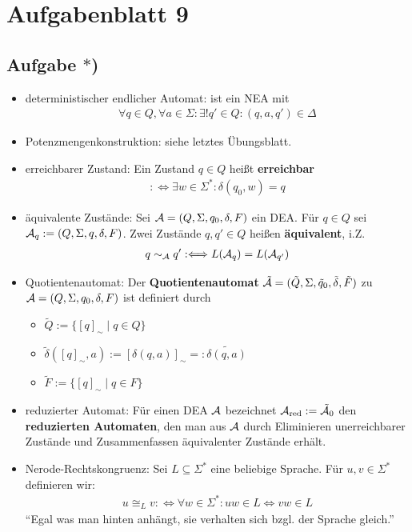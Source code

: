 \section{Aufgabenblatt 9}
\subsection*{Aufgabe $\ast$)}
\begin{itemize}
	\item deterministischer endlicher Automat: ist ein NEA mit
	\begin{align*}
		\forall q\in Q,\forall a\in\Sigma:\exists! q'\in Q:(q,a,q')\in\Delta
	\end{align*}
	\item Potenzmengenkonstruktion: siehe letztes Übungsblatt.
	\item erreichbarer Zustand: Ein Zustand $q\in Q$ heißt \textbf{erreichbar}
	\begin{align*}
		:\Longleftrightarrow\exists w\in\Sigma^\ast:\delta(q_0,w)=q
	\end{align*}
	\item äquivalente Zustände: Sei $\mathcal{A}=(Q,\Sigma,q_0,\delta,F)$ ein DEA. 
	Für $q\in Q$ sei $\mathcal{A}_q:=(Q,\Sigma,q,\delta,F)$. 
	Zwei Zustände $q,q'\in Q$ heißen \textbf{äquivalent}, i.Z. 
	\begin{align*}
		q\sim_{\mathcal{A}} q':\Longleftrightarrow L(\mathcal{A}_q)=L(\mathcal{A}_{q'})
	\end{align*}
	\item Quotientenautomat: Der \textbf{Quotientenautomat} 
	$\tilde{\mathcal{A}}=(\tilde{Q},\Sigma,\tilde{q}_0,\tilde{\delta},\tilde{F})$ zu\\ $\mathcal{A}=(Q,\Sigma,q_0,\delta,F)$ ist definiert durch
	\begin{itemize}
		\item $\tilde{Q}:=\lbrace[q]_\sim\mid q\in Q\rbrace$
		\item $\tilde{\delta}([q]_\sim,a):=[\delta(q,a)]_\sim=:\widetilde{\delta(q,a)}$
		\item $\tilde{F}:=\lbrace[q]_\sim\mid q\in F\rbrace$
	\end{itemize}
	\item reduzierter Automat: Für einen DEA $\mathcal{A}$ bezeichnet $\mathcal{A}_{\text{red}}:=\tilde{\mathcal{A}}_0$ den 	\textbf{reduzierten Automaten}, den man aus $\mathcal{A}$ durch Eliminieren unerreichbarer Zustände und Zusammenfassen äquivalenter Zustände erhält.
	\item Nerode-Rechtskongruenz: Sei $L\subseteq\Sigma^\ast$ eine beliebige Sprache. 
	Für $u,v\in\Sigma^\ast$ definieren wir:
	\begin{align*}
		u\cong_L v:\Longleftrightarrow\forall w\in\Sigma^\ast:uw\in L\Leftrightarrow vw\in L
	\end{align*}
	``Egal was man hinten anhängt, sie verhalten sich bzgl. der Sprache gleich.''
\end{itemize}

